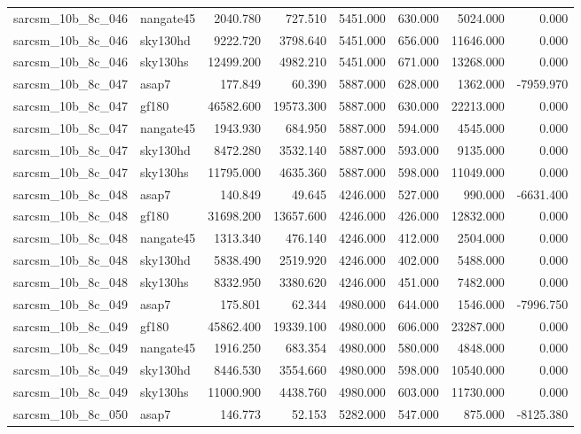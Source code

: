 \begin{tabular}{llrrrrrr}
sarcsm\_10b\_8c\_046 & nangate45 & 2040.780 & 727.510 & 5451.000 & 630.000 & 5024.000 & 0.000 \\
sarcsm\_10b\_8c\_046 & sky130hd & 9222.720 & 3798.640 & 5451.000 & 656.000 & 11646.000 & 0.000 \\
sarcsm\_10b\_8c\_046 & sky130hs & 12499.200 & 4982.210 & 5451.000 & 671.000 & 13268.000 & 0.000 \\
sarcsm\_10b\_8c\_047 & asap7 & 177.849 & 60.390 & 5887.000 & 628.000 & 1362.000 & -7959.970 \\
sarcsm\_10b\_8c\_047 & gf180 & 46582.600 & 19573.300 & 5887.000 & 630.000 & 22213.000 & 0.000 \\
sarcsm\_10b\_8c\_047 & nangate45 & 1943.930 & 684.950 & 5887.000 & 594.000 & 4545.000 & 0.000 \\
sarcsm\_10b\_8c\_047 & sky130hd & 8472.280 & 3532.140 & 5887.000 & 593.000 & 9135.000 & 0.000 \\
sarcsm\_10b\_8c\_047 & sky130hs & 11795.000 & 4635.360 & 5887.000 & 598.000 & 11049.000 & 0.000 \\
sarcsm\_10b\_8c\_048 & asap7 & 140.849 & 49.645 & 4246.000 & 527.000 & 990.000 & -6631.400 \\
sarcsm\_10b\_8c\_048 & gf180 & 31698.200 & 13657.600 & 4246.000 & 426.000 & 12832.000 & 0.000 \\
sarcsm\_10b\_8c\_048 & nangate45 & 1313.340 & 476.140 & 4246.000 & 412.000 & 2504.000 & 0.000 \\
sarcsm\_10b\_8c\_048 & sky130hd & 5838.490 & 2519.920 & 4246.000 & 402.000 & 5488.000 & 0.000 \\
sarcsm\_10b\_8c\_048 & sky130hs & 8332.950 & 3380.620 & 4246.000 & 451.000 & 7482.000 & 0.000 \\
sarcsm\_10b\_8c\_049 & asap7 & 175.801 & 62.344 & 4980.000 & 644.000 & 1546.000 & -7996.750 \\
sarcsm\_10b\_8c\_049 & gf180 & 45862.400 & 19339.100 & 4980.000 & 606.000 & 23287.000 & 0.000 \\
sarcsm\_10b\_8c\_049 & nangate45 & 1916.250 & 683.354 & 4980.000 & 580.000 & 4848.000 & 0.000 \\
sarcsm\_10b\_8c\_049 & sky130hd & 8446.530 & 3554.660 & 4980.000 & 598.000 & 10540.000 & 0.000 \\
sarcsm\_10b\_8c\_049 & sky130hs & 11000.900 & 4438.760 & 4980.000 & 603.000 & 11730.000 & 0.000 \\
sarcsm\_10b\_8c\_050 & asap7 & 146.773 & 52.153 & 5282.000 & 547.000 & 875.000 & -8125.380 \\

\end{tabular}

